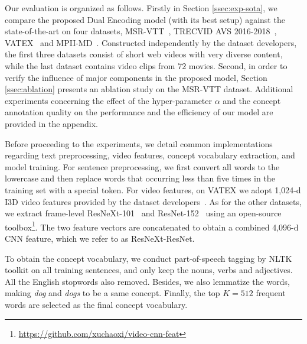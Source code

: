 

Our evaluation is organized as follows. Firstly in Section \ref{ssec:exp-sota}, we compare the proposed Dual Encoding model (with its best setup) against the state-of-the-art on four datasets, \ie MSR-VTT~\cite{xu2016msr}, TRECVID AVS 2016-2018~\cite{AwadTRECVID16,AwadTRECVID17,AwadTRECVID18}, VATEX~\cite{wang2019vatex} and MPII-MD~\cite{rohrbach2015dataset}. Constructed independently by the dataset developers, the first three datasets consist of short web videos with very diverse content, while the last dataset contains video clips from 72 movies. 
Second, in order to verify the influence of major components in the proposed model, Section \ref{ssec:ablation} presents an ablation study on the MSR-VTT dataset.  Additional experiments concerning the effect of the hyper-parameter $\alpha$ and the concept annotation quality on the performance and the efficiency of our model are provided in the appendix.



Before proceeding to the experiments, we detail common implementations regarding text preprocessing, video features, concept vocabulary extraction, and model training. 
For sentence preprocessing, we first convert all words to the lowercase and then replace words that occurring less than five times in the training set with a special token. 
For video features, on VATEX we adopt 1,024-d I3D \cite{carreira2017quo} video features provided by the dataset developers~\cite{wang2019vatex}.
As for the other datasets, we extract frame-level ResNeXt-101~\cite{xie2017aggregated,mettes2020shuffled} and ResNet-152~\cite{cvpr2016-resnet} using an open-source toolbox\footnote{\url{https://github.com/xuchaoxi/video-cnn-feat}}. The two feature vectors are concatenated to obtain a combined 4,096-d CNN feature, which we refer to as ResNeXt-ResNet.


To obtain the concept vocabulary, we conduct part-of-speech tagging by NLTK toolkit on all training sentences, and only keep the nouns, verbs and adjectives. All the English stopwords also removed. Besides, we also lemmatize the words, making \textit{dog} and \textit{dogs} to be a same concept. Finally, the top $K=512$ frequent words are selected as the final concept vocabulary.

